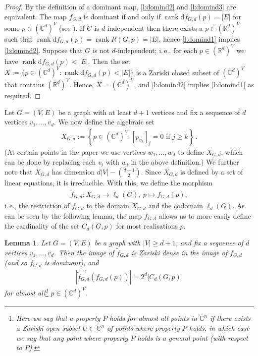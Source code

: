 \documentclass[11pt]{article}
\newtheorem{lemma}[theo]{Lemma}
\theoremstyle{definition}
\numberwithin{equation}{section}
\DeclareMathOperator{\rank}{rank}
\newcommand{\diff}{\mathrm{d}}
\begin{document}
\begin{proof}
	By the definition of a dominant map, \ref{l:domind2} and \ref{l:domind3} are equivalent.
	The map $f_{G,d}$ is dominant if and only if $\rank \diff f_{G,d}(p) = |E|$ for some $p \in (\mathbb{C}^{d})^V$ (see ).
	If $G$ is $d$-independent then there exists a $p \in (\mathbb{R}^{d})^V$ such that $\rank \diff f_{G,d}(p) = \rank R(G,p) = |E|$,
	hence \ref{l:domind1} implies \ref{l:domind2}.
	Suppose that $G$ is not $d$-independent;
	i.\,e., for each $p \in (\mathbb{R}^{d})^V$ we have $\rank \diff f_{G,d}(p) < |E|$.
	Then the set $X := \{ p \in (\mathbb{C}^{d})^V: \rank \diff f_{G,d}(p) < |E| \}$ is a Zariski closed subset of $(\mathbb{C}^{d})^V$ that contains $(\mathbb{R}^{d})^V$.
	Hence, $X = (\mathbb{C}^{d})^V$,
	and \ref{l:domind2} implies \ref{l:domind1} as required.
\end{proof}

Let $G=(V,E)$ be a graph with at least $d+1$ vertices and fix a sequence of $d$ vertices $v_1,\ldots, v_d$.
We now define the algebraic set
\begin{align}\label{eq:xset}
	X_{G,d} := \left\{ p \in (\mathbb{C}^{d})^V : [p_{v_k}]_j=0 \text{ if } j \geq k  \right\}\,.
\end{align}
(At certain points in the paper we use vertices $w_1,\ldots,w_d$ to define $X_{G,d}$,
which can be done by replacing each $v_i$ with $w_i$ in the above definition.)
We further note that $X_{G,d}$ has dimension $d|V| - \binom{d+1}{2}$.
Since $X_{G,d}$ is defined by a set of linear equations,
it is irreducible.
With this, we define the morphism
\begin{align*}
	\tilde{f}_{G,d} : X_{G,d} \rightarrow \ell_d(G), ~ p \mapsto f_{G,d}(p),
\end{align*}
i.\,e., the restriction of $f_{G,d}$ to the domain $X_{G,d}$ and the codomain $\ell_d(G)$.
As can be seen by the following lemma, the map $\tilde{f}_{G,d}$ allows us to more easily define the cardinality of the set $C_d(G,p)$ for most realisations $p$.

\begin{lemma}\label{l:xgd}
	Let $G=(V,E)$ be a graph with $|V| \geq d+1$,
	and fix a sequence of $d$ vertices $v_1,\ldots, v_d$.
	Then the image of $\tilde{f}_{G,d}$ is Zariski dense in the image of $f_{G,d}$ (and so $\tilde{f}_{G,d}$ is dominant),
	and
	\begin{align*}
		\left|\tilde{f}_{G,d}^{-1}\left(f_{G,d}(p) \right) \right| = 2^{d} |C_d(G,p)|
	\end{align*}
	for almost all\footnote{Here we say that a property $P$ holds \emph{for almost all points in $\mathbb{C}^n$} if there exists a Zariski open subset $U \subset \mathbb{C}^n$ of points where property $P$ holds, in which case we say that any point where property $P$ holds is a \emph{general point (with respect to $P$)}.} $p \in (\mathbb{C}^d)^V$.
\end{lemma}
\end{document}
